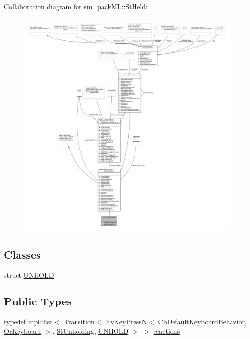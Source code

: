 Collaboration diagram for sm\+\_\+pack\+ML\+:\+:St\+Held\+:
\nopagebreak
\begin{figure}[H]
\begin{center}
\leavevmode
\includegraphics[width=350pt]{structsm__packML_1_1StHeld__coll__graph}
\end{center}
\end{figure}
\subsection*{Classes}
\begin{DoxyCompactItemize}
\item 
struct \hyperlink{structsm__packML_1_1StHeld_1_1UNHOLD}{U\+N\+H\+O\+LD}
\end{DoxyCompactItemize}
\subsection*{Public Types}
\begin{DoxyCompactItemize}
\item 
typedef mpl\+::list$<$ Transition$<$ Ev\+Key\+PressN$<$ Cb\+Default\+Keyboard\+Behavior, \hyperlink{classsm__packML_1_1OrKeyboard}{Or\+Keyboard} $>$, \hyperlink{structsm__packML_1_1StUnholding}{St\+Unholding}, \hyperlink{structsm__packML_1_1StHeld_1_1UNHOLD}{U\+N\+H\+O\+LD} $>$ $>$ \hyperlink{structsm__packML_1_1StHeld_acced2f8015ea42707a87101aa52c1621}{reactions}
\end{DoxyCompactItemize}
